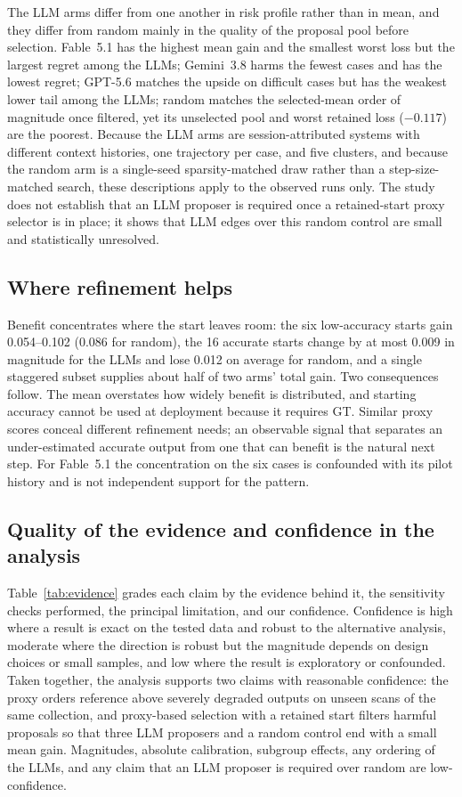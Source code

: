 \documentclass[a4paper,fleqn]{cas-dc}
\begin{document}
The LLM arms differ from one another in risk profile rather than in mean, and they differ from random mainly in the quality of the proposal pool before selection. Fable~5.1 has the highest mean gain and the smallest worst loss but the largest regret among the LLMs; Gemini~3.8 harms the fewest cases and has the lowest regret; GPT-5.6 matches the upside on difficult cases but has the weakest lower tail among the LLMs; random matches the selected-mean order of magnitude once filtered, yet its unselected pool and worst retained loss ($-0.117$) are the poorest. Because the LLM arms are session-attributed systems with different context histories, one trajectory per case, and five clusters, and because the random arm is a single-seed sparsity-matched draw rather than a step-size-matched search, these descriptions apply to the observed runs only. The study does not establish that an LLM proposer is required once a retained-start proxy selector is in place; it shows that LLM edges over this random control are small and statistically unresolved.

\subsection{Where refinement helps}

Benefit concentrates where the start leaves room: the six low-accuracy starts gain 0.054--0.102 (0.086 for random), the 16 accurate starts change by at most 0.009 in magnitude for the LLMs and lose 0.012 on average for random, and a single staggered subset supplies about half of two arms' total gain. Two consequences follow. The mean overstates how widely benefit is distributed, and starting accuracy cannot be used at deployment because it requires GT. Similar proxy scores conceal different refinement needs; an observable signal that separates an under-estimated accurate output from one that can benefit is the natural next step. For Fable~5.1 the concentration on the six cases is confounded with its pilot history and is not independent support for the pattern.

\subsection{Quality of the evidence and confidence in the analysis}\label{sec:evidence}

Table~\ref{tab:evidence} grades each claim by the evidence behind it, the sensitivity checks performed, the principal limitation, and our confidence. Confidence is high where a result is exact on the tested data and robust to the alternative analysis, moderate where the direction is robust but the magnitude depends on design choices or small samples, and low where the result is exploratory or confounded. Taken together, the analysis supports two claims with reasonable confidence: the proxy orders reference above severely degraded outputs on unseen scans of the same collection, and proxy-based selection with a retained start filters harmful proposals so that three LLM proposers and a random control end with a small mean gain. Magnitudes, absolute calibration, subgroup effects, any ordering of the LLMs, and any claim that an LLM proposer is required over random are low-confidence.
\end{document}
